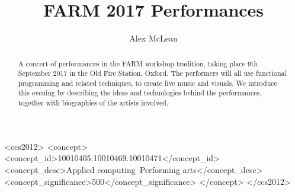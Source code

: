 \documentclass[sigplan,10pt]{acmart}\settopmatter{}
\begin{document}
\title[FARM 2017 Performances]{FARM 2017 Performances}         %



\author{Alex McLean}

\begin{abstract}
A concert of performances in the FARM workshop tradition, taking place
9th September 2017 in the Old Fire Station, Oxford. The performers
will all use functional programming and related techniques, to create
live music and visuals. We introduce this evening by describing the
ideas and technologies behind the performances, together with
biographies of the artists involved.
\end{abstract}


\begin{CCSXML}
<ccs2012>
<concept>
<concept_id>10010405.10010469.10010471</concept_id>
<concept_desc>Applied computing~Performing arts</concept_desc>
<concept_significance>500</concept_significance>
</concept>
</ccs2012>
\end{CCSXML}
\end{document}
